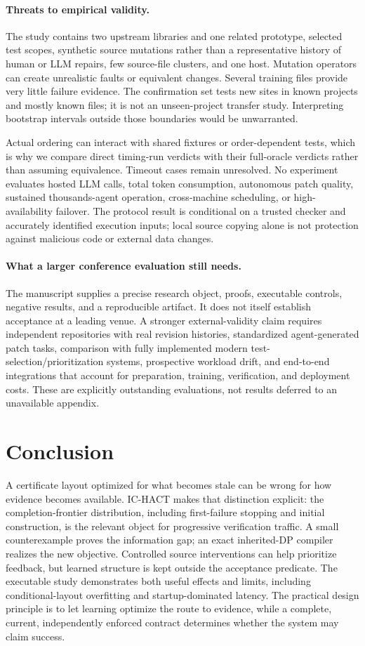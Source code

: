 \paragraph{Threats to empirical validity.}
The study contains two upstream libraries and one related prototype, selected test scopes, synthetic source mutations rather than a representative history of human or LLM repairs, few source-file clusters, and one host. Mutation operators can create unrealistic faults or equivalent changes. Several training files provide very little failure evidence. The confirmation set tests new sites in known projects and mostly known files; it is not an unseen-project transfer study. Interpreting bootstrap intervals outside those boundaries would be unwarranted.

Actual ordering can interact with shared fixtures or order-dependent tests, which is why we compare direct timing-run verdicts with their full-oracle verdicts rather than assuming equivalence. Timeout cases remain unresolved. No experiment evaluates hosted LLM calls, total token consumption, autonomous patch quality, sustained thousands-agent operation, cross-machine scheduling, or high-availability failover. The protocol result is conditional on a trusted checker and accurately identified execution inputs; local source copying alone is not protection against malicious code or external data changes.

\paragraph{What a larger conference evaluation still needs.}
The manuscript supplies a precise research object, proofs, executable controls, negative results, and a reproducible artifact. It does not itself establish acceptance at a leading venue. A stronger external-validity claim requires independent repositories with real revision histories, standardized agent-generated patch tasks, comparison with fully implemented modern test-selection/prioritization systems, prospective workload drift, and end-to-end integrations that account for preparation, training, verification, and deployment costs. These are explicitly outstanding evaluations, not results deferred to an unavailable appendix.

\section{Conclusion}
A certificate layout optimized for what becomes stale can be wrong for how evidence becomes available. IC-HACT makes that distinction explicit: the completion-frontier distribution, including first-failure stopping and initial construction, is the relevant object for progressive verification traffic. A small counterexample proves the information gap; an exact inherited-DP compiler realizes the new objective. Controlled source interventions can help prioritize feedback, but learned structure is kept outside the acceptance predicate. The executable study demonstrates both useful effects and limits, including conditional-layout overfitting and startup-dominated latency. The practical design principle is to let learning optimize the route to evidence, while a complete, current, independently enforced contract determines whether the system may claim success.

